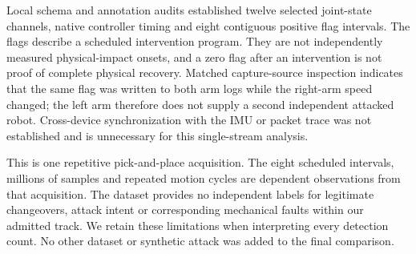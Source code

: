 Local schema and annotation audits established twelve selected joint-state channels, native controller timing and eight contiguous positive flag intervals. The flags describe a scheduled intervention program. They are not independently measured physical-impact onsets, and a zero flag after an intervention is not proof of complete physical recovery. Matched capture-source inspection indicates that the same flag was written to both arm logs while the right-arm speed changed; the left arm therefore does not supply a second independent attacked robot. Cross-device synchronization with the IMU or packet trace was not established and is unnecessary for this single-stream analysis.

This is one repetitive pick-and-place acquisition. The eight scheduled intervals, millions of samples and repeated motion cycles are dependent observations from that acquisition. The dataset provides no independent labels for legitimate changeovers, attack intent or corresponding mechanical faults within our admitted track. We retain these limitations when interpreting every detection count. No other dataset or synthetic attack was added to the final comparison.
